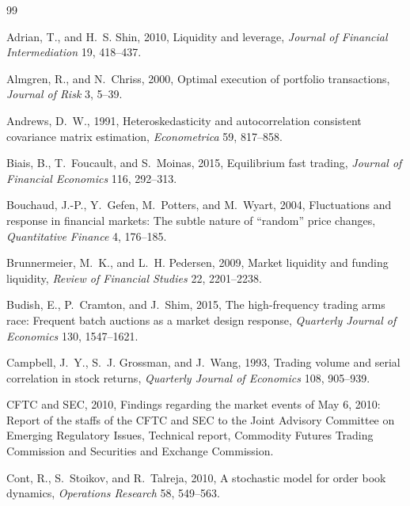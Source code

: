 \documentclass[12pt]{article}
\theoremstyle{definition}
\theoremstyle{remark}
\begin{document}
\newpage
\begin{thebibliography}{99}
\small
\setlength{\itemsep}{0.0pt plus 0.3pt}
\setlength{\parsep}{0.0pt}

Adrian, T., and H.~S. Shin, 2010, Liquidity and leverage, \emph{Journal of Financial Intermediation} 19, 418--437.

Almgren, R., and N.~Chriss, 2000, Optimal execution of portfolio transactions, \emph{Journal of Risk} 3, 5--39.

Andrews, D.~W., 1991, Heteroskedasticity and autocorrelation consistent covariance matrix estimation, \emph{Econometrica} 59, 817--858.

Biais, B., T.~Foucault, and S.~Moinas, 2015, Equilibrium fast trading, \emph{Journal of Financial Economics} 116, 292--313.

Bouchaud, J.-P., Y.~Gefen, M.~Potters, and M.~Wyart, 2004, Fluctuations and response in financial markets: The subtle nature of ``random'' price changes, \emph{Quantitative Finance} 4, 176--185.

Brunnermeier, M.~K., and L.~H. Pedersen, 2009, Market liquidity and funding liquidity, \emph{Review of Financial Studies} 22, 2201--2238.

Budish, E., P.~Cramton, and J.~Shim, 2015, The high-frequency trading arms race: Frequent batch auctions as a market design response, \emph{Quarterly Journal of Economics} 130, 1547--1621.

Campbell, J.~Y., S.~J. Grossman, and J.~Wang, 1993, Trading volume and serial correlation in stock returns, \emph{Quarterly Journal of Economics} 108, 905--939.

CFTC and SEC, 2010, Findings regarding the market events of May 6, 2010: Report of the staffs of the CFTC and SEC to the Joint Advisory Committee on Emerging Regulatory Issues, Technical report, Commodity Futures Trading Commission and Securities and Exchange Commission.

Cont, R., S.~Stoikov, and R.~Talreja, 2010, A stochastic model for order book dynamics, \emph{Operations Research} 58, 549--563.


\end{thebibliography}
\end{document}
